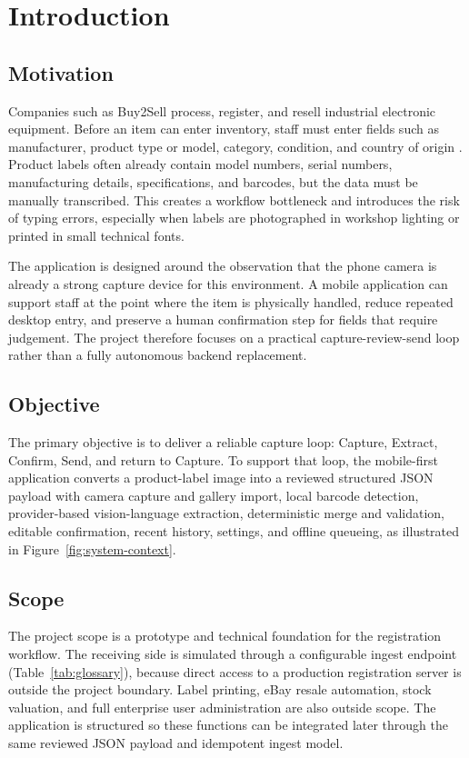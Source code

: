 \chapter{Introduction}
\label{chap:introduction}

\section{Motivation}

Companies such as Buy2Sell process, register, and resell industrial electronic equipment. Before an item can enter inventory, staff must enter fields such as manufacturer, product type or model, category, condition, and country of origin \cite{buy2sell-brief}. Product labels often already contain model numbers, serial numbers, manufacturing details, specifications, and barcodes, but the data must be manually transcribed. This creates a workflow bottleneck and introduces the risk of typing errors, especially when labels are photographed in workshop lighting or printed in small technical fonts.

The application is designed around the observation that the phone camera is already a strong capture device for this environment. A mobile application can support staff at the point where the item is physically handled, reduce repeated desktop entry, and preserve a human confirmation step for fields that require judgement. The project therefore focuses on a practical capture-review-send loop rather than a fully autonomous backend replacement.

\section{Objective}

The primary objective is to deliver a reliable capture loop: Capture, Extract, Confirm, Send, and return to Capture. To support that loop, the mobile-first application converts a product-label image into a reviewed structured JSON payload with camera capture and gallery import, local barcode detection, provider-based vision-language extraction, deterministic merge and validation, editable confirmation, recent history, settings, and offline queueing, as illustrated in Figure~\ref{fig:system-context}.

\section{Scope}

The project scope is a prototype and technical foundation for the registration workflow. The receiving side is simulated through a configurable ingest endpoint (Table~\ref{tab:glossary}), because direct access to a production registration server is outside the project boundary. Label printing, eBay resale automation, stock valuation, and full enterprise user administration are also outside scope. The application is structured so these functions can be integrated later through the same reviewed JSON payload and idempotent ingest model.

